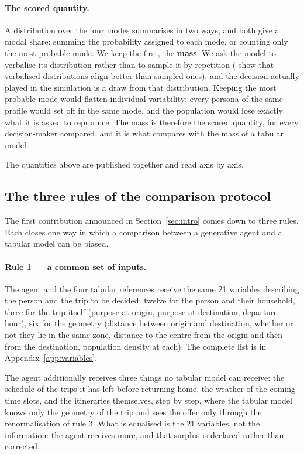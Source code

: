 \paragraph{The scored quantity.} A distribution over the four modes summarises in two ways, and both give a modal share: summing the probability assigned to each mode, or counting only the most probable mode. We keep the first, the \textbf{mass}. We ask the model to verbalise its distribution rather than to sample it by repetition (\citet{meister2024benchmarking} show that verbalised distributions align better than sampled ones), and the decision actually played in the simulation is a draw from that distribution. Keeping the most probable mode would flatten individual variability: every persona of the same profile would set off in the same mode, and the population would lose exactly what it is asked to reproduce. The mass is therefore the scored quantity, for every decision-maker compared, and it is what compares with the mass of a tabular model.

The quantities above are published together and read axis by axis.

\subsection{The three rules of the comparison protocol}
\label{sec:contract}

The first contribution announced in Section~\ref{sec:intro} comes down to three rules. Each closes one way in which a comparison between a generative agent and a tabular model can be biased.

\paragraph{Rule 1 — a common set of inputs.} The agent and the four tabular references receive the same 21 variables describing the person and the trip to be decided: twelve for the person and their household, three for the trip itself (purpose at origin, purpose at destination, departure hour), six for the geometry (distance between origin and destination, whether or not they lie in the same zone, distance to the centre from the origin and then from the destination, population density at each). The complete list is in Appendix~\ref{app:variables}.

The agent additionally receives three things no tabular model can receive: the schedule of the trips it has left before returning home, the weather of the coming time slots, and the itineraries themselves, step by step, where the tabular model knows only the geometry of the trip and sees the offer only through the renormalisation of rule 3.
What is equalised is the 21 variables, not the information: the agent receives more, and that surplus is declared rather than corrected.

